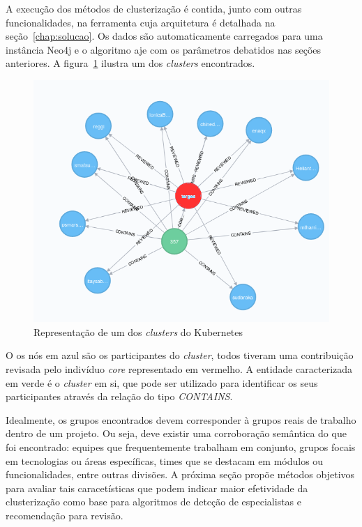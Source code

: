 \documentclass[12pt,openany,oneside,a4paper,english,brazil]{abntbibufjf}
\begin{document}
  A execução dos métodos de clusterização é contida, junto com outras funcionalidades, na ferramenta cuja arquitetura é detalhada na seção~\ref{chap:solucao}. Os dados são automaticamente carregados para uma instância Neo4j e o algoritmo aje com os parâmetros debatidos nas seções anteriores. A figura~\ref{fig:cluster} ilustra um dos \textit{clusters} encontrados.

  \begin{figure}[tbp]
  \centerline{\includegraphics[width=\linewidth]{cluster}}
  \caption{Representação de um dos \textit{clusters} do Kubernetes}
  \label{fig:cluster}
  \end{figure}

  O os nós em azul são os participantes do \textit{cluster}, todos tiveram uma contribuição revisada pelo indivíduo \textit{core} representado em vermelho. A entidade caracterizada em verde é o \textit{cluster} em si, que pode ser utilizado para identificar os seus participantes através da relação do tipo \textit{CONTAINS}.

  Idealmente, os grupos encontrados devem corresponder à grupos reais de trabalho dentro de um projeto. Ou seja, deve existir uma corroboração semântica do que foi encontrado: equipes que frequentemente trabalham em conjunto, grupos focais em tecnologias ou áreas específicas, times que se destacam em módulos ou funcionalidades, entre outras divisões. A próxima seção propõe métodos objetivos para avaliar tais caracetísticas que podem indicar maior efetividade da clusterização como base para algoritmos de detcção de especialistas e recomendação para revisão.
\end{document}
